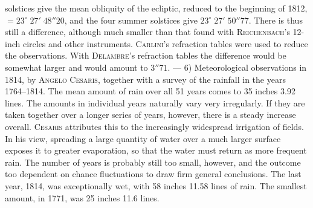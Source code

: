 solstices give the mean obliquity of the ecliptic, reduced to the beginning of 1812, $=23^\circ\;27'\;48''20$, and the four summer solstices give $23^\circ\;27'\;50''77$. There is thus still a difference, although much smaller than that found with \textsc{Reichenbach}’s 12-inch circles and other instruments. \textsc{Carlini}’s refraction tables were used to reduce the observations. With \textsc{Delambre}’s refraction tables the difference would be somewhat larger and would amount to $3''71$. --- 6) Meteorological observations in 1814, by \textsc{Angelo Cesaris}, together with a survey of the rainfall in the years 1764--1814. The mean amount of rain over all 51 years comes to 35 inches 3.92 lines. The amounts in individual years naturally vary very irregularly. If they are taken together over a longer series of years, however, there is a steady increase overall. \textsc{Cesaris} attributes this to the increasingly widespread irrigation of fields. In his view, spreading a large quantity of water over a much larger surface exposes it to greater evaporation, so that the water must return as more frequent rain. The number of years is probably still too small, however, and the outcome too dependent on chance fluctuations to draw firm general conclusions. The last year, 1814, was exceptionally wet, with 58 inches 11.58 lines of rain. The smallest amount, in 1771, was 25 inches 11.6 lines.
